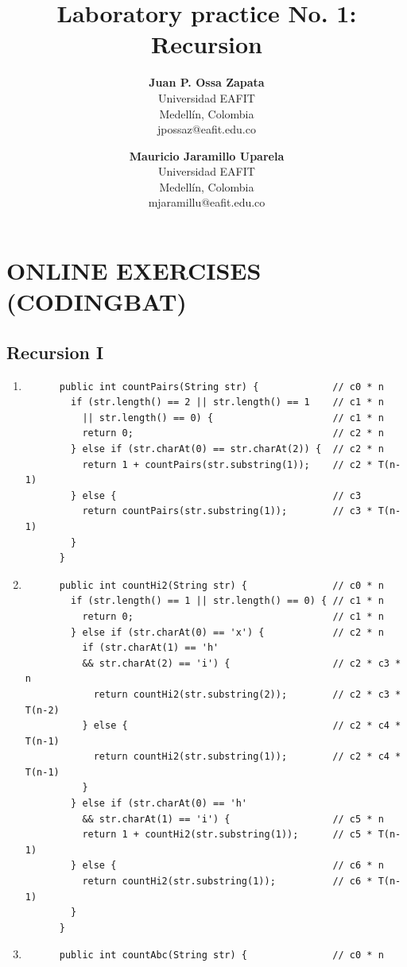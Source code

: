 \documentclass[a4paper,12pt]{article}
\title{\color{Eblue}\textbf{Laboratory practice No. 1: Recursion}}
\author{
  \textbf{Juan P. Ossa Zapata}\\
  Universidad EAFIT\\
  Medellín, Colombia\\
  jpossaz@eafit.edu.co
\and
  \textbf{Mauricio Jaramillo Uparela}\\
  Universidad EAFIT\\
  Medellín, Colombia\\
  mjaramillu@eafit.edu.co
}
\begin{document}
  \maketitle
  \thispagestyle{fancy}

  \section{ONLINE EXERCISES (CODINGBAT)}
  \subsection{Recursion I}
    \begin{enumerate}
      \item \begin{Verbatim}
      public int countPairs(String str) {             // c0 * n
        if (str.length() == 2 || str.length() == 1    // c1 * n
          || str.length() == 0) {                     // c1 * n
          return 0;                                   // c2 * n
        } else if (str.charAt(0) == str.charAt(2)) {  // c2 * n
          return 1 + countPairs(str.substring(1));    // c2 * T(n-1)
        } else {                                      // c3
          return countPairs(str.substring(1));        // c3 * T(n-1)
        }
      }
      \end{Verbatim}
      \item \begin{Verbatim}
      public int countHi2(String str) {               // c0 * n
        if (str.length() == 1 || str.length() == 0) { // c1 * n
          return 0;                                   // c1 * n
        } else if (str.charAt(0) == 'x') {            // c2 * n
          if (str.charAt(1) == 'h'
          && str.charAt(2) == 'i') {                  // c2 * c3 * n
            return countHi2(str.substring(2));        // c2 * c3 * T(n-2)
          } else {                                    // c2 * c4 * T(n-1)
            return countHi2(str.substring(1));        // c2 * c4 * T(n-1)
          }
        } else if (str.charAt(0) == 'h'
          && str.charAt(1) == 'i') {                  // c5 * n
          return 1 + countHi2(str.substring(1));      // c5 * T(n-1)
        } else {                                      // c6 * n
          return countHi2(str.substring(1));          // c6 * T(n-1)
        }
      }
      \end{Verbatim}
      \item \begin{Verbatim}
      public int countAbc(String str) {               // c0 * n

\end{Verbatim}
\end{enumerate}
\end{document}

